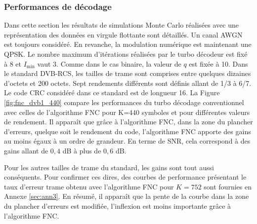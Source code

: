 \subsubsection{Performances de décodage}
Dans cette section les résultats de simulations Monte Carlo réalisées avec une représentation des données en virgule
flottante sont détaillés. Un canal AWGN est toujours considéré. En revanche, la modulation numérique est maintenant une QPSK. Le 
nombre maximum d'itérations réalisées par le turbo décodeur est fixé à 8 et $I_{\text{min}}$ vaut 3.
Comme dans le cas binaire, la valeur de $q$ est fixée à 10. Dans le standard DVB-RCS, les tailles de trame sont comprises
entre quelques dizaines d'octets et 200 octets. Sept rendements différents sont définis allant de 1/3 à 6/7. Le code CRC 
considéré dans ce standard est de longueur 16. La Figure \ref{fig:fnc_dvb1_440} compare les performances du turbo décodage
conventionnel avec celles de l'algorithme FNC pour K=440 symboles et pour différentes valeurs de rendement. 
Il apparaît que grâce à l'algorithme FNC, dans la zone du plancher d'erreurs, quelque soit le rendement du code, l'algorithme FNC apporte 
des gains au moins égaux à un ordre de grandeur. 
En terme de SNR, cela correspond à des gains allant de $0,4$ dB à plus de 
$0,6$ dB.

Pour les autres tailles de trame du standard, les gains sont tout aussi conséquents. Pour confirmer ces
dires, des courbes de performance présentant le taux d'erreur trame obtenu avec l'algorithme FNC pour $K=752$ sont fournies en 
Annexe \ref{sec:ann3}. En résumé, il apparaît que la pente de la courbe dans la zone du plancher d'erreurs est modifiée, l'inflexion
est moins importante grâce à l'algorithme FNC.

